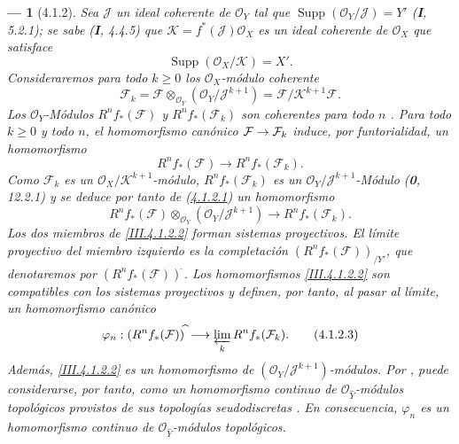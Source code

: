 \documentclass[10pt,oneside,openany]{book}
\theoremstyle{egaenv}\newtheorem*{env}{---}
\theoremstyle{egastatement}
\theoremstyle{egadescription}
\renewcommand{\geq}{\geqslant}
\renewcommand{\to}{\mathchoice{\longrightarrow}{\rightarrow}{\rightarrow}{\rightarrow}}
\begin{document}
\begin{env}[4.1.2]
\label{III.4.1.2}
\label{III.4.1.2-fr}
Sea $\mathcal J$ un ideal coherente de $\mathcal O_Y$ tal que
$\operatorname{Supp}(\mathcal O_Y/\mathcal J)=Y'$ (\textbf{I}, 5.2.1); se sabe (\textbf{I}, 4.4.5) que $\mathcal K=f^*(\mathcal J)\mathcal O_X$
es un ideal coherente de $\mathcal O_X$ que satisface
\[
\operatorname{Supp}(\mathcal O_X/\mathcal K)=X'.
\]
Consideraremos para todo $k\geq0$ los $\mathcal O_X$-módulo coherente
\[
\mathcal F_k
=\mathcal F\otimes_{\mathcal O_Y}(\mathcal O_Y/\mathcal J^{k+1})
=\mathcal F/\mathcal K^{k+1}\mathcal F.
\]
Los $\mathcal O_Y$-Módulos $R^nf_*(\mathcal F)$ y
$R^nf_*(\mathcal F_k)$ son \emph{coherentes} para todo $n$ .
Para todo $k\geq0$ y todo $n$, el homomorfismo canónico
$\mathcal F\to\mathcal F_k$ induce, por funtorialidad, un homomorfismo
\[
R^nf_*(\mathcal F)\longrightarrow R^nf_*(\mathcal F_k).
\tag{4.1.2.1}\label{III.4.1.2.1-fr}
\]
Como $\mathcal F_k$ es un $\mathcal O_X/\mathcal K^{k+1}$-módulo,
$R^nf_*(\mathcal F_k)$ es un
$\mathcal O_Y/\mathcal J^{k+1}$-Módulo (\textbf{0}, 12.2.1) y se deduce por tanto de (\hyperref[III.4.1.2.1-fr]{4.1.2.1}) un homomorfismo \[
R^nf_*(\mathcal F)\otimes_{\mathcal O_Y}
(\mathcal O_Y/\mathcal J^{k+1})
\longrightarrow R^nf_*(\mathcal F_k).
\tag{4.1.2.2}\label{III.4.1.2.2-fr}
\]
Los dos miembros de \eqref{III.4.1.2.2} forman sistemas proyectivos.
El límite proyectivo del miembro izquierdo es la \emph{completación}
$(R^nf_*(\mathcal F))_{/Y'}$,
que denotaremos por
$(R^nf_*(\mathcal F))^{\widehat{\,}}$.
Los homomorfismos \eqref{III.4.1.2.2} son compatibles con los sistemas
proyectivos y definen, por tanto, al pasar al límite, un \emph{homomorfismo
canónico}
\[
\varphi_n:(R^nf_*(\mathcal F))^{\widehat{\,}}
\longrightarrow\varprojlim_kR^nf_*(\mathcal F_k).
\tag{4.1.2.3}\label{III.4.1.2.3-fr}
\]
Además, \eqref{III.4.1.2.2} es un homomorfismo de
$(\mathcal O_Y/\mathcal J^{k+1})$-módulos.
Por , puede considerarse, por tanto, como un
homomorfismo continuo de $\mathcal O_{\widehat Y}$-módulos topológicos
provistos de sus topologías seudodiscretas .
En consecuencia, $\varphi_n$ es un homomorfismo \emph{continuo} de
$\mathcal O_{\widehat Y}$-módulos topológicos.
\end{env}
\end{document}
